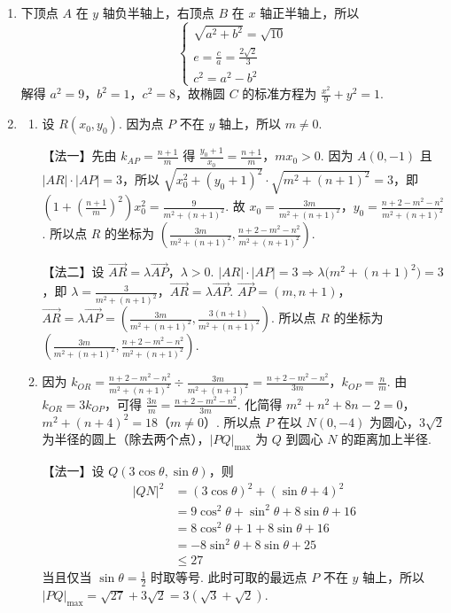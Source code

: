 \documentclass[UTF8,a4paper,oneside,11pt]{ctexbook}
\begin{document}
\begin{solution}
\begin{enumerate}
\item 下顶点 \(A\) 在 \(y\) 轴负半轴上，右顶点 \(B\) 在 \(x\) 轴正半轴上，所以
\[
\begin{cases}
\sqrt{a^2+b^2}=\sqrt{10}\\
e=\frac{c}{a}=\frac{2\sqrt{2}}{3}\\
c^2=a^2-b^2
\end{cases}
\]
解得 \(a^2=9\)，\(b^2=1\)，\(c^2=8\)，故椭圆 \(C\) 的标准方程为 \(\frac{x^2}{9}+y^2=1\).

\item
\begin{enumerate}
\item 设 \(R(x_0,y_0)\). 因为点 \(P\) 不在 \(y\) 轴上，所以 \(m \neq 0\).

【法一】先由 \(k_{AP}=\frac{n+1}{m}\) 得
\(\frac{y_0+1}{x_0}=\frac{n+1}{m}\)，\(m x_0>0\). 因为 \(A(0,-1)\) 且 \(|AR|\cdot|AP|=3\)，所以 \(\sqrt{x_0^2+(y_0+1)^2}\cdot \sqrt{m^2+(n+1)^2}=3\)，即 \(\left(1+\left(\frac{n+1}{m}\right)^2\right)x_0^2 =\frac{9}{m^2+(n+1)^2}\). 故 \(x_0=\frac{3m}{m^2+(n+1)^2}\)，\(y_0=\frac{n+2-m^2-n^2}{m^2+(n+1)^2}\). 所以点 \(R\) 的坐标为 \(\left(\frac{3m}{m^2+(n+1)^2},\frac{n+2-m^2-n^2}{m^2+(n+1)^2}\right)\).

【法二】设 \(\overrightarrow{AR}=\lambda \overrightarrow{AP}\)，\(\lambda>0\).
\(|AR|\cdot|AP|=3\Rightarrow \lambda\bigl(m^2+(n+1)^2\bigr)=3\)，即 \(\lambda=\frac{3}{m^2+(n+1)^2}\)，\(\overrightarrow{AR}=\lambda \overrightarrow{AP}\). \(\overrightarrow{AP}=(m,n+1)\)，\(\overrightarrow{AR}=\lambda\overrightarrow{AP} =\left(\frac{3m}{m^2+(n+1)^2},\frac{3(n+1)}{m^2+(n+1)^2}\right)\). 所以点 \(R\) 的坐标为 \(\left(\frac{3m}{m^2+(n+1)^2},\frac{n+2-m^2-n^2}{m^2+(n+1)^2}\right)\).


\item 因为 \(k_{OR}=\frac{n+2-m^2-n^2}{m^2+(n+1)^2}\div\frac{3m}{m^2+(n+1)^2} =\frac{n+2-m^2-n^2}{3m}\)，\(k_{OP}=\frac{n}{m}\). 由 \(k_{OR}=3k_{OP}\)，可得 \(\frac{3n}{m}=\frac{n+2-m^2-n^2}{3m}\). 化简得 \(m^2+n^2+8n-2=0\)，\(m^2+(n+4)^2=18\)（\(m\neq0\)）.
所以点 \(P\) 在以 \(N(0,-4)\) 为圆心，\(3\sqrt{2}\) 为半径的圆上（除去两个点），\(|PQ|_{\max}\) 为 \(Q\) 到圆心 \(N\) 的距离加上半径.

【法一】设 \(Q(3\cos\theta,\sin\theta)\)，则
\begin{align*}
|QN|^2&=(3\cos\theta)^2+(\sin\theta+4)^2\\
&=9\cos^2\theta+\sin^2\theta+8\sin\theta+16\\
&=8\cos^2\theta+1+8\sin\theta+16\\
&=-8\sin^2\theta+8\sin\theta+25\\
&\le 27
\end{align*}
当且仅当 \(\sin\theta=\frac{1}{2}\) 时取等号. 此时可取的最远点 \(P\) 不在 \(y\) 轴上，所以 \(|PQ|_{\max}=\sqrt{27}+3\sqrt{2}=3(\sqrt{3}+\sqrt{2})\).


\end{enumerate}
\end{enumerate}
\end{solution}
\end{document}
